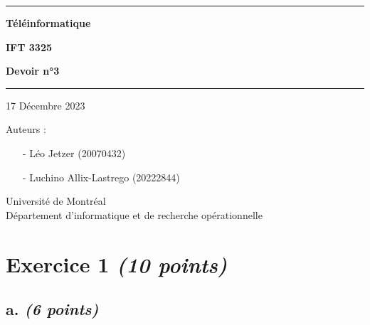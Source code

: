 \documentclass{article}
\begin{document}
\begin{titlepage}

	\begin{center}
		\hrule

		\vspace{.5cm}

		\Huge
		\textbf{Téléinformatique}

		\vspace{.3cm}
		\LARGE

		\textbf{IFT 3325}
		\vspace{.3cm}

		\textbf{Devoir n°3}
		\vspace{.3cm}

		\hrule

		\vspace{1cm}

		17 Décembre 2023 \\
	\end{center}

	\vspace{2cm}

	\LARGE

	\noindent Auteurs :

	\begin{enumerate}
		\item[-] Léo Jetzer (20070432)
		\item[-] Luchino Allix-Lastrego (20222844)   
	\end{enumerate}


			
	\vfill


	\begin{center}


		\vspace{0.8cm}

		Université de Montréal\\
		Département d'informatique et de recherche opérationnelle\\

	\end{center}
	
\end{titlepage}

\section{Exercice 1 \emph{(10 points)}}

\subsection{a. \emph{(6 points)}} %
\end{document}
